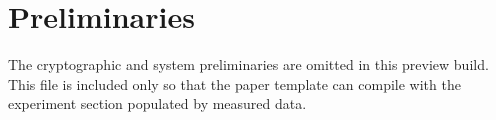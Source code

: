 \section{Preliminaries}
The cryptographic and system preliminaries are omitted in this preview build. This file is included only so that the paper template can compile with the experiment section populated by measured data.
